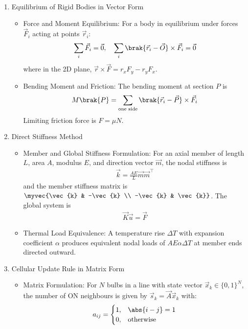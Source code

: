 \begin{enumerate}[label=\thesubsection.\arabic*, ref=\thesubsection.\theenumi,itemsep=0pt]
\item Equilibrium of Rigid Bodies in Vector Form
\begin{itemize}
\item Force and Moment Equilibrium:
For a body in equilibrium under forces $\vec{F}_i$ acting at points $\vec{r}_i$:
\begin{align}
\sum_i \vec{F}_i = \vec{0}, \quad \sum_i \brak{\vec{r}_i - \vec{O}} \times \vec{F}_i = \vec{0}
\label{eq:equil} %
\end{align}
where in the 2D plane, $\vec{r} \times \vec{F} = r_x F_y - r_y F_x$.
\item Bending Moment and Friction:
The bending moment at section $P$ is
\begin{align} %
M\brak{P} = \sum_{\text{one side}} \brak{\vec{r}_i - \vec{P}} \times \vec{F}_i
\label{eq:bm} %
\end{align}
Limiting friction force is $F = \mu N$.
\end{itemize}

\item Direct Stiffness Method
\begin{itemize}
\item Member and Global Stiffness Formulation:
For an axial member of length $L$, area $A$, modulus $E$, and direction vector $\vec{m}$, the nodal stiffness is
\begin{align} %
\vec{k} = \frac{AE}{L}\vec{m}\vec{m}^\top
\label{eq:kbar} %
\end{align}
and the member stiffness matrix is $\myvec{\vec{k} & -\vec{k} \\ -\vec{k} & \vec{k}}$. The global system is
\begin{align} %
\vec{K}\vec{u} = \vec{F}
\label{eq:kuf} %
\end{align}
\item Thermal Load Equivalence:
A temperature rise $\Delta T$ with expansion coefficient $\alpha$ produces equivalent nodal loads of $AE\alpha\Delta T$ at member ends directed outward.
\end{itemize}

\item Cellular Update Rule in Matrix Form
\begin{itemize}
\item Matrix Formulation:
For $N$ bulbs in a line with state vector $\vec{x}_k \in \{0, 1\}^N$, the number of ON neighbours is given by $\vec{s}_k = \vec{A}\vec{x}_k$ with:
\begin{align}
a_{ij} = \begin{cases} 1, & \abs{i - j} = 1 \\ 0, & \text{otherwise} \end{cases}
\label{eq:adj} %
\end{align}
\end{itemize}


\end{enumerate}
